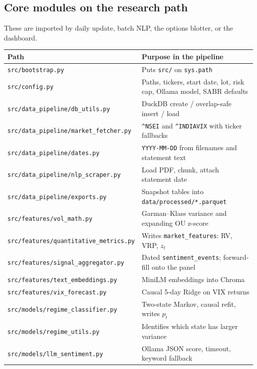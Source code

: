 \documentclass[11pt,a4paper]{article}
\begin{document}
\subsection{Core modules on the research path}

These are imported by daily update, batch NLP, the options blotter, or the dashboard.

\begin{center}
\begin{tabular}{@{}p{}p{}@{}}
\toprule
Path & Purpose in the pipeline \\
\midrule
\texttt{src/bootstrap.py} & Puts \texttt{src/} on \texttt{sys.path} \\
\texttt{src/config.py} & Paths, tickers, start date, lot, risk cap, Ollama model, SABR defaults \\
\texttt{src/data\_pipeline/db\_utils.py} & DuckDB create / overlap-safe insert / load \\
\texttt{src/data\_pipeline/market\_fetcher.py} & \texttt{\^{}NSEI} and \texttt{\^{}INDIAVIX} with ticker fallbacks \\
\texttt{src/data\_pipeline/dates.py} & \texttt{YYYY-MM-DD} from filenames and statement text \\
\texttt{src/data\_pipeline/nlp\_scraper.py} & Load PDF, chunk, attach statement date \\
\texttt{src/data\_pipeline/exports.py} & Snapshot tables into \texttt{data/processed/*.parquet} \\
\texttt{src/features/vol\_math.py} & Garman--Klass variance and expanding OU z-score \\
\texttt{src/features/quantitative\_metrics.py} & Writes \texttt{market\_features}: RV, VRP, $z_t$ \\
\texttt{src/features/signal\_aggregator.py} & Dated \texttt{sentiment\_events}; forward-fill onto the panel \\
\texttt{src/features/text\_embeddings.py} & MiniLM embeddings into Chroma \\
\texttt{src/features/vix\_forecast.py} & Causal 5-day Ridge on VIX returns \\
\texttt{src/models/regime\_classifier.py} & Two-state Markov, causal refit, writes $p_t$ \\
\texttt{src/models/regime\_utils.py} & Identifies which state has larger variance \\
\texttt{src/models/llm\_sentiment.py} & Ollama JSON score, timeout, keyword fallback \\

\end{tabular}
\end{center}
\end{document}
